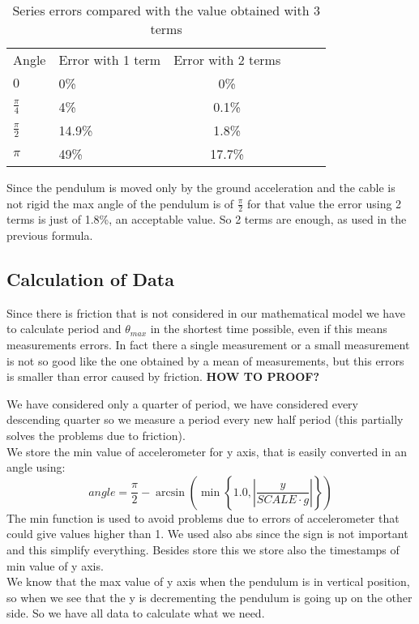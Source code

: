 \begin{table}[H]
	\small
	\begin{center}
		
		\caption{Series errors compared with the value obtained with 3 terms}
		\begin{tabular}{l|lcc|L{2cm}l}
			Angle & Error with 1 term & Error with 2 terms\\
			$0$ & 0\% & 0\%\\			
			$\frac{\pi}{4}$ & 4\% & 0.1\%\\			
			$\frac{\pi}{2}$ & 14.9\% & 1.8\%\\			
			$\pi$ & 49\% & 17.7\%\\			
		\end{tabular}
		\label{tab:errors}
	\end{center}
\end{table}

Since the pendulum is moved only by the ground acceleration and the cable is not rigid the max angle of the pendulum is of $\frac{\pi}{2}$ for that value the error using 2 terms is just of 1.8\%, an acceptable value. So 2 terms are enough, as used in the previous formula.

\subsection{Calculation of Data}
Since there is friction that is not considered in our mathematical model we have to calculate period and $\theta_{max}$ in the shortest time possible, even if this means measurements errors. In fact there a single measurement or a small measurement is not so good like the one obtained by a mean of measurements, but this errors is smaller than error caused by friction. \textbf{HOW TO PROOF?}\par

We have considered only a quarter of period, we have considered every descending quarter so we measure a period every new half period (this partially solves the problems due to friction).\\
We store the min value of accelerometer for y axis, that is easily converted in an angle using:
$$angle = \frac{\pi}{2} -\arcsin\left(\min\left\lbrace1.0, \left|\frac{y}{SCALE \cdot g}\right|\right\rbrace\right)$$
The min function is used to avoid problems due to errors of accelerometer that could give values higher than 1. We used also abs since the sign is not important and this simplify everything.
Besides store this we store also the timestamps of min value of y axis.\\
We know that the max value of y axis when the pendulum is in vertical position, so when we see that the y is decrementing the pendulum is going up on the other side. So we have all data to calculate what we need.\par


